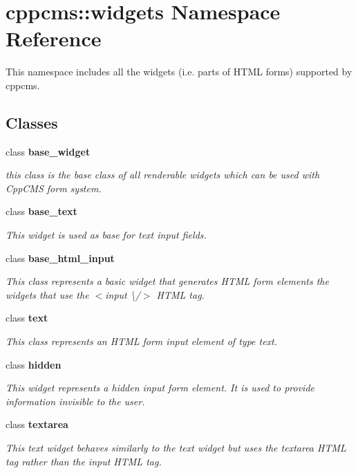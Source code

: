\section{cppcms\-:\-:widgets Namespace Reference}
\label{namespacecppcms_1_1widgets}


This namespace includes all the widgets (i.\-e. parts of H\-T\-M\-L forms) supported by cppcms.  


\subsection*{Classes}
\begin{DoxyCompactItemize}
\item 
class {\bf base\-\_\-widget}
\begin{DoxyCompactList}\small\item\em this class is the base class of all renderable widgets which can be used with Cpp\-C\-M\-S form system. \end{DoxyCompactList}\item 
class {\bf base\-\_\-text}
\begin{DoxyCompactList}\small\item\em This widget is used as base for text input fields. \end{DoxyCompactList}\item 
class {\bf base\-\_\-html\-\_\-input}
\begin{DoxyCompactList}\small\item\em This class represents a basic widget that generates H\-T\-M\-L form elements the widgets that use the $<$input \textbackslash{}/$>$ H\-T\-M\-L tag. \end{DoxyCompactList}\item 
class {\bf text}
\begin{DoxyCompactList}\small\item\em This class represents an H\-T\-M\-L form input element of type text. \end{DoxyCompactList}\item 
class {\bf hidden}
\begin{DoxyCompactList}\small\item\em This widget represents a hidden input form element. It is used to provide information invisible to the user. \end{DoxyCompactList}\item 
class {\bf textarea}
\begin{DoxyCompactList}\small\item\em This text widget behaves similarly to the text widget but uses the {\ttfamily textarea} H\-T\-M\-L tag rather than the {\ttfamily input} H\-T\-M\-L tag. \end{DoxyCompactList}\item 

\end{DoxyCompactItemize}
